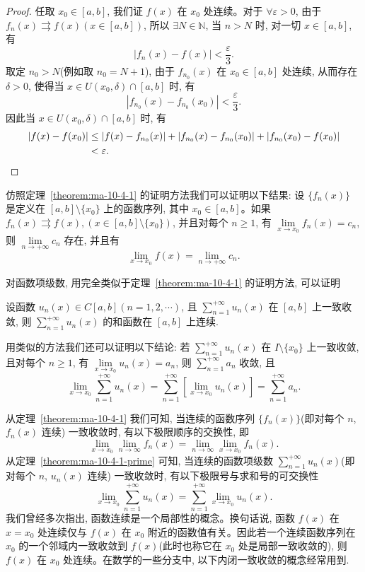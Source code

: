 \begin{proof}
任取 $x_0\in[a,b]$, 我们证 $f(x)$ 在 $x_0$ 处连续。对于 $\forall\varepsilon>0$, 由于 $f_n(x)\rightrightarrows f(x)(x\in[a,b])$, 所以 $\exists N\in\mathbb N$, 当 $n>N$ 时, 对一切 $x\in[a,b]$, 有
\[
  |f_n(x)-f(x)|<\frac\varepsilon3.
\]
取定 $n_0>N$(例如取 $n_0=N+1$), 由于 $f_{n_0}(x)$ 在 $x_0\in[a,b]$ 处连续, 从而存在 $\delta>0$, 使得当 $x\in U(x_0,\delta)\cap[a,b]$ 时, 有
\[
  |f_{n_0}(x)-f_{n_0}(x_0)|<\frac\varepsilon3.
\]
因此当 $x\in U(x_0,\delta)\cap[a,b]$ 时, 有
\[
\begin{aligned}
  |f(x)-f(x_0)|
  &\leq |f(x)-f_{n_0}(x)|+|f_{n_0}(x)-f_{n_0}(x_0)|+|f_{n_0}(x_0)-f(x_0)|\\
  &<\varepsilon.
\end{aligned}
\qedhere
\]
\end{proof}


\begin{remark}\label{remark:ma-10-source-47}
仿照定理~\ref{theorem:ma-10-4-1} 的证明方法我们可以证明以下结果: 设 $\{f_n(x)\}$ 是定义在 $[a,b]\setminus\{x_0\}$ 上的函数序列, 其中 $x_0\in[a,b]$。如果 $f_n(x)\rightrightarrows f(x), (x\in[a,b]\setminus\{x_0\})$, 并且对每个 $n\geq1$, 有 $\lim\limits_{x\to x_0}f_n(x)=c_n$, 则 $\lim\limits_{n\to+\infty}c_n$ 存在, 并且有
\[
  \lim_{x\to x_0}f(x)=\lim_{n\to+\infty}c_n.
\]
\end{remark}

对函数项级数, 用完全类似于定理~\ref{theorem:ma-10-4-1} 的证明方法, 可以证明

\begin{theorem}\label{theorem:ma-10-4-1-prime}
设函数 $u_n(x)\in C[a,b](n=1,2,\cdots)$, 且 $\sum\limits_{n=1}^{+\infty}u_n(x)$ 在 $[a,b]$ 上一致收敛, 则 $\sum\limits_{n=1}^{+\infty}u_n(x)$ 的和函数在 $[a,b]$ 上连续.
\end{theorem}


\begin{remark}\label{remark:ma-10-source-49}
用类似的方法我们还可以证明以下结论: 若 $\sum\limits_{n=1}^{+\infty}u_n(x)$ 在 $I\setminus\{x_0\}$ 上一致收敛, 且对每个 $n\geq1$, 有 $\lim\limits_{x\to x_0}u_n(x)=a_n$, 则 $\sum\limits_{n=1}^{+\infty}a_n$ 收敛, 且
\[
  \lim_{x\to x_0}\sum_{n=1}^{+\infty}u_n(x)
  =\sum_{n=1}^{+\infty}\left[\lim_{x\to x_0}u_n(x)\right]
  =\sum_{n=1}^{+\infty}a_n.
\]
\end{remark}

从定理~\ref{theorem:ma-10-4-1} 我们可知, 当连续的函数序列 $\{f_n(x)\}$(即对每个 $n$, $f_n(x)$ 连续) 一致收敛时, 有以下极限顺序的交换性, 即
\[
  \lim_{x\to x_0}\lim_{n\to\infty}f_n(x)
  =\lim_{n\to\infty}\lim_{x\to x_0}f_n(x).
\]
从定理~\ref{theorem:ma-10-4-1-prime} 可知, 当连续的函数项级数 $\sum\limits_{n=1}^{+\infty}u_n(x)$(即对每个 $n$, $u_n(x)$ 连续) 一致收敛时, 有以下极限号与求和号的可交换性
\[
  \lim_{x\to x_0}\sum_{n=1}^{+\infty}u_n(x)
  =\sum_{n=1}^{+\infty}\lim_{x\to x_0}u_n(x).
\]
我们曾经多次指出, 函数连续是一个局部性的概念。换句话说, 函数 $f(x)$ 在 $x=x_0$ 处连续仅与 $f(x)$ 在 $x_0$ 附近的函数值有关。因此若一个连续函数序列在 $x_0$ 的一个邻域内一致收敛到 $f(x)$(此时也称它在 $x_0$ 处是局部一致收敛的), 则 $f(x)$ 在 $x_0$ 处连续。在数学的一些分支中, 以下内闭一致收敛的概念经常用到.

